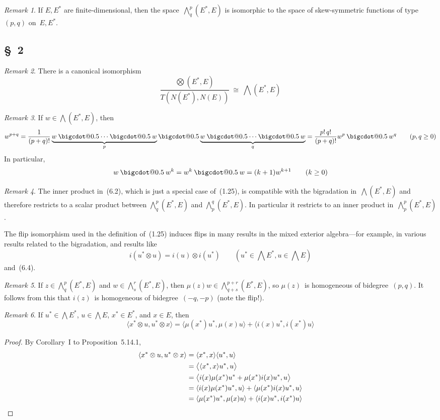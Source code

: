 \documentclass[letterpaper,12pt]{article}
\makeatletter
\newcommand{\iso}{\cong}
\newcommand{\bigcdot}[1]{\mathbin{\mathpalette\bigcdot@{#1}}}
\newcommand{\bigcdot@}[2]{%
  \sbox0{$#1\vcenter{}$}%
  \sbox2{$#1\cdot\m@th$}%
  \hbox{%
    \hfil
    \raise\ht0\hbox{%
      \scalebox{#2}{%
        \lower\ht0\hbox{$#1\bullet\m@th$}%
      }%
    }%
    \hfil
  }%
}
\newcommand{\tprod}{\otimes}
\newcommand{\bigtprod}{\bigotimes}
\newcommand{\medtprod}{{\textstyle\bigtprod}}
\newcommand{\bigeprod}{\bigwedge}
\newcommand{\medeprod}{{\textstyle\bigeprod}}
\newcommand{\mprod}{\bigcdot{0.5}}
\newcommand{\sprod}[2]{\langle#1,#2\rangle}
\newcommand{\bigsprod}[2]{\big\langle#1,#2\big\rangle}
\newcommand{\multi}[4]{#2_{#3}#1\cdots#1#2_{#4}}
\newcommand{\mprods}[3]{\multi{\mprod}{#1}{#2}{#3}}
\theoremstyle{definition}
\theoremstyle{remark}
\newtheorem*{rmk}{Remark}
\makeatother
\begin{document}
\begin{rmk}
If \(E,E^*\) are finite-dimensional, then the space~\(\medeprod^p_q(E^*,E)\) is isomorphic to the space of skew-symmetric functions of type~\((p,q)\) on~\(E,E^*\).
\end{rmk}

\subsection*{\S~2}
\begin{rmk}
There is a canonical isomorphism
\[\frac{\medtprod(E^*,E)}{T(N(E^*),N(E))}\ \iso\ \medeprod(E^*,E)\]
\end{rmk}

\begin{rmk}
If \(w\in\medeprod(E^*,E)\), then
\[w^{p+q}=\frac{1}{(p+q)!}\underbrace{\mprods{w}{}{}}_p\mprod\underbrace{\mprods{w}{}{}}_q=\frac{p!\,q!}{(p+q)!}w^p\mprod w^q\qquad(p,q\ge 0)\]
In particular,
\[w\mprod w^k=w^k\mprod w=(k+1)w^{k+1}\qquad(k\ge 0)\]
\end{rmk}

\begin{rmk}
The inner product in~(6.2), which is just a special case of~(1.25), is compatible with the bigradation in~\(\medeprod(E^*,E)\) and therefore restricts to a scalar product between \(\medeprod^p_q(E^*,E)\) and \(\medeprod^q_p(E^*,E)\). In particular it restricts to an inner product in~\(\medeprod^p_p(E^*,E)\).

The flip isomorphism used in the definition of~(1.25) induces flips in many results in the mixed exterior algebra---for example, in various results related to the bigradation, and results like
\[i(u^*\tprod u)=i(u)\tprod i(u^*)\qquad(u^*\in\medeprod E^*,u\in\medeprod E)\]
and~(6.4).
\end{rmk}

\begin{rmk}
If \(z\in\medeprod^p_q(E^*,E)\) and \(w\in\medeprod^r_s(E^*,E)\), then \(\mu(z)w\in\medeprod^{p+r}_{q+s}(E^*,E)\), so \(\mu(z)\)~is homogeneous of bidegree~\((p,q)\). It follows from this that \(i(z)\)~is homogeneous of bidegree~\((-q,-p)\) (note the flip!).
\end{rmk}

\begin{rmk}
If \(u^*\in\medeprod E^*\), \(u\in\medeprod E\), \(x^*\in E^*\), and \(x\in E\), then
\[\sprod{x^*\tprod u}{u^*\tprod x}=\sprod{\mu(x^*)u^*}{\mu(x)u}+\sprod{i(x)u^*}{i(x^*)u}\]
\end{rmk}
\begin{proof}
By Corollary~I to Proposition~5.14.1,
\begin{align*}
\sprod{x^*\tprod u}{u^*\tprod x}&=\sprod{x^*}{x}\sprod{u^*}{u}\\
	&=\bigsprod{\sprod{x^*}{x}u^*}{u}\\
	&=\bigsprod{i(x)\mu(x^*)u^*+\mu(x^*)i(x)u^*}{u}\\
	&=\sprod{i(x)\mu(x^*)u^*}{u}+\sprod{\mu(x^*)i(x)u^*}{u}\\
	&=\sprod{\mu(x^*)u^*}{\mu(x)u}+\sprod{i(x)u^*}{i(x^*)u}\qedhere
\end{align*}
\end{proof}
\end{document}
